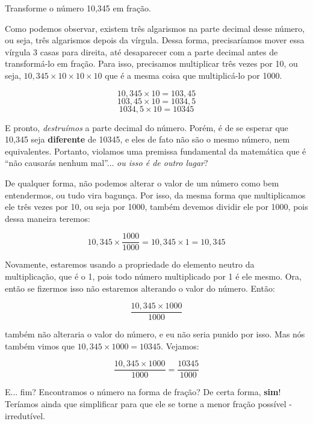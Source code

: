 \begin{exemplo}
    Transforme o número 10,345 em fração.

    \vspace{0.5cm}

    Como podemos observar, existem três algarismos na parte decimal desse número, ou seja, três algarismos depois da vírgula. Dessa forma, precisaríamos mover essa vírgula 3 casas para direita, até desaparecer com a parte decimal antes de transformá-lo em fração. Para isso, precisamos multiplicar três vezes por 10, ou seja, \(10,345\times10\times10\times10\) que é a mesma coisa que multiplicá-lo por 1000.

    \begin{equation}
        10,345\times10=103,45
    \end{equation}
    \begin{equation}
        103,45\times10=1034,5
    \end{equation}
    \begin{equation}
        1034,5\times10=10345
    \end{equation}

    E pronto, \textit{destruímos} a parte decimal do número. Porém, é de se esperar que 10,345 seja \textbf{diferente} de 10345, e eles de fato não são o mesmo número, nem equivalentes. Portanto, violamos uma premissa fundamental da matemática que é ``não causarás nenhum mal''... \textit{ou isso é de outro lugar}? 

    \vspace{0.5cm}

    De qualquer forma, não podemos alterar o valor de um número como bem entendermos, ou tudo vira bagunça. Por isso, da mesma forma que multiplicamos ele três vezes por 10, ou seja por 1000, também devemos dividir ele por 1000, pois dessa maneira teremos:

    \begin{equation}
        10,345\times\frac{1000}{1000}=10,345\times1=10,345
    \end{equation}

    Novamente, estaremos usando a propriedade do elemento neutro da multiplicação, que é o 1, pois todo número multiplicado por 1 é ele mesmo. Ora, então se fizermos isso não estaremos alterando o valor do número. Então:

    \begin{equation}
        \frac{10,345\times1000}{1000}
    \end{equation}

    também não alteraria o valor do número, e eu não seria punido por isso. Mas nós também vimos que \(10,345\times1000=10345\). Vejamos:

    \begin{equation}
        \frac{10,345\times1000}{1000}=\frac{10345}{1000}
    \end{equation}

    E... fim? Encontramos o número na forma de fração? De certa forma, \textbf{sim}! Teríamos ainda que simplificar para que ele se torne a menor fração possível - irredutível.
\end{exemplo}

